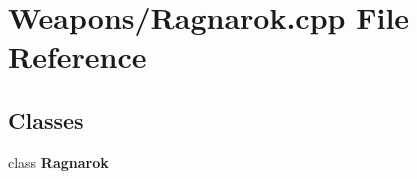 \section{Weapons/\-Ragnarok.cpp File Reference}
\label{_ragnarok_8cpp}
\subsection*{Classes}
\begin{DoxyCompactItemize}
\item 
class {\bf Ragnarok}
\end{DoxyCompactItemize}
